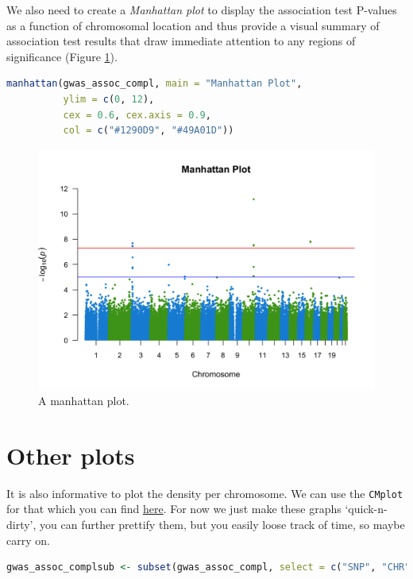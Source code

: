 \documentclass[
]{book}
\newcommand{\passthrough}[1]{#1}
\begin{document}
We also need to create a \emph{Manhattan plot} to display the association test P-values as a function of chromosomal location and thus provide a visual summary of association test results that draw immediate attention to any regions of significance (Figure \ref{fig:show-manhattan}).

\begin{lstlisting}[language=R]
manhattan(gwas_assoc_compl, main = "Manhattan Plot",
          ylim = c(0, 12),
          cex = 0.6, cex.axis = 0.9,
          col = c("#1290D9", "#49A01D"))
\end{lstlisting}

\begin{figure}

{\centering \includegraphics[width=18.67in]{img/show-manhattan} 

}

\caption{A manhattan plot.}\label{fig:show-manhattan}
\end{figure}

\hypertarget{other-plots}{%
\section{Other plots}\label{other-plots}}

It is also informative to plot the density per chromosome. We can use the \passthrough{\lstinline!CMplot!} for that which you can find \href{https://github.com/YinLiLin/R-CMplot}{here}. For now we just make these graphs `quick-n-dirty', you can further prettify them, but you easily loose track of time, so maybe carry on.

\begin{lstlisting}[language=R]
gwas_assoc_complsub <- subset(gwas_assoc_compl, select = c("SNP", "CHR", "BP", "P"))
\end{lstlisting}
\end{document}

